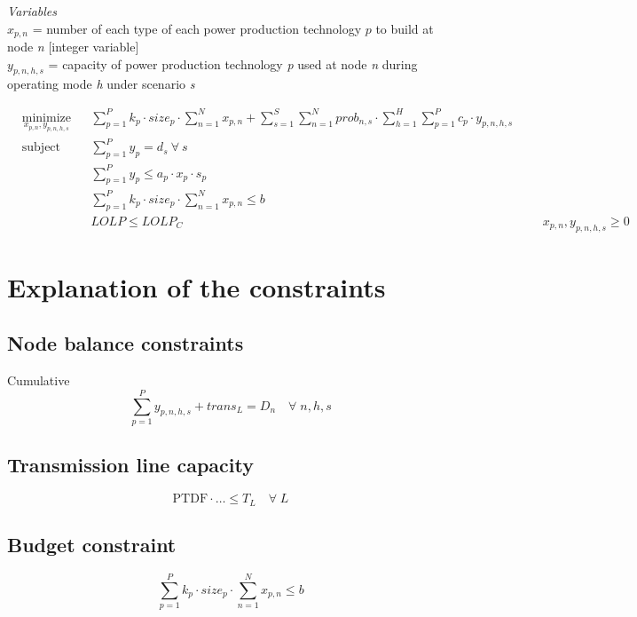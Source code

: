 \documentclass[10pt]{amsart}
\begin{document}
\begin{flushleft}
\textit{Variables} \\
$x_{p,n}$ = number of each type of each power production technology $\textit{p}$ to build at node \textit{n} [integer variable] \\
$y_{p,n,h,s}$ = capacity of power production technology \textit{p} used at node \textit{n} during operating mode \textit{h} under scenario \textit{s} \\
\end{flushleft}

\begin{equation*}
\begin{aligned}
& \underset{x_{p,n}, y_{p,n,h,s}}{\text{minimize}} & & \sum_{p=1}^{P} k_{p}\cdot size_{p}\cdot \sum_{n=1}^{N} x_{p,n} + \sum_{s=1}^{S} \sum_{n=1}^{N} prob_{n,s} \cdot \sum_{h=1}^{H}\sum_{p=1}^{P} c_{p}\cdot y_{p,n,h,s} \\
& \text{subject to} & & \sum_{p=1}^{P} y_{p} = d_{s} \ \forall \ s \\
& &&\sum_{p=1}^{P} y_{p} \leq a_{p}\cdot x_{p}\cdot s_{p}\\
& &&\sum_{p=1}^{P} k_{p} \cdot size_{p} \cdot \sum_{n=1}^{N} x_{p,n} \leq b \\
& &&LOLP \leq LOLP_{C}
& && x_{p,n}, y_{p,n,h,s} \geq 0
\end{aligned}
\end{equation*}

\section{Explanation of the constraints}
\subsection{Node balance constraints}
Cumulative
\begin{equation}
\sum_{p=1}^{P} y_{p,n,h,s} + trans_{L} = D_{n} \quad \forall \; n,h,s
\end{equation}
\subsection{Transmission line capacity}
\begin{equation}
\text{PTDF}\cdot \ldots \leq T_{L} \quad \forall \; L
\end{equation}
\subsection{Budget constraint} 
\begin{equation}
\sum_{p=1}^{P} k_{p} \cdot size_{p} \cdot \sum_{n=1}^{N}x_{p,n} \leq b
\end{equation}
\end{document}
